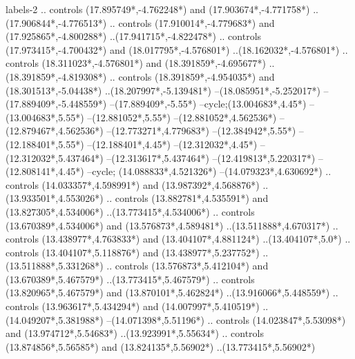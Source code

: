 {\begin{scope}[x=1mm,y=1mm,line width=\SCstroke mm,line cap=round,line join=round]
\begin{SCpart}{labels-2}
.. controls ({17.895749*\SCF},{-4.762248*\SCF}) and ({17.903674*\SCF},{-4.771758*\SCF}) ..({17.906844*\SCF},{-4.776513*\SCF})
.. controls ({17.910014*\SCF},{-4.779683*\SCF}) and ({17.925865*\SCF},{-4.800288*\SCF}) ..({17.941715*\SCF},{-4.822478*\SCF})
.. controls ({17.973415*\SCF},{-4.700432*\SCF}) and ({18.017795*\SCF},{-4.576801*\SCF}) ..({18.162032*\SCF},{-4.576801*\SCF})
.. controls ({18.311023*\SCF},{-4.576801*\SCF}) and ({18.391859*\SCF},{-4.695677*\SCF}) ..({18.391859*\SCF},{-4.819308*\SCF})
.. controls ({18.391859*\SCF},{-4.954035*\SCF}) and ({18.301513*\SCF},{-5.04438*\SCF}) ..({18.207997*\SCF},{-5.139481*\SCF})
--({18.085951*\SCF},{-5.252017*\SCF})
--({17.889409*\SCF},{-5.448559*\SCF})
--({17.889409*\SCF},{-5.55*\SCF})
--cycle; ({13.004683*\SCF},{4.45*\SCF})
--({13.004683*\SCF},{5.55*\SCF})
--({12.881052*\SCF},{5.55*\SCF})
--({12.881052*\SCF},{4.562536*\SCF})
--({12.879467*\SCF},{4.562536*\SCF})
--({12.773271*\SCF},{4.779683*\SCF})
--({12.384942*\SCF},{5.55*\SCF})
--({12.188401*\SCF},{5.55*\SCF})
--({12.188401*\SCF},{4.45*\SCF})
--({12.312032*\SCF},{4.45*\SCF})
--({12.312032*\SCF},{5.437464*\SCF})
--({12.313617*\SCF},{5.437464*\SCF})
--({12.419813*\SCF},{5.220317*\SCF})
--({12.808141*\SCF},{4.45*\SCF})
--cycle;
 ({14.088833*\SCF},{4.521326*\SCF})
--({14.079323*\SCF},{4.630692*\SCF})
.. controls ({14.033357*\SCF},{4.598991*\SCF}) and ({13.987392*\SCF},{4.568876*\SCF}) ..({13.933501*\SCF},{4.553026*\SCF})
.. controls ({13.882781*\SCF},{4.535591*\SCF}) and ({13.827305*\SCF},{4.534006*\SCF}) ..({13.773415*\SCF},{4.534006*\SCF})
.. controls ({13.670389*\SCF},{4.534006*\SCF}) and ({13.576873*\SCF},{4.589481*\SCF}) ..({13.511888*\SCF},{4.670317*\SCF})
.. controls ({13.438977*\SCF},{4.763833*\SCF}) and ({13.404107*\SCF},{4.881124*\SCF}) ..({13.404107*\SCF},{5.0*\SCF})
.. controls ({13.404107*\SCF},{5.118876*\SCF}) and ({13.438977*\SCF},{5.237752*\SCF}) ..({13.511888*\SCF},{5.331268*\SCF})
.. controls ({13.576873*\SCF},{5.412104*\SCF}) and ({13.670389*\SCF},{5.467579*\SCF}) ..({13.773415*\SCF},{5.467579*\SCF})
.. controls ({13.820965*\SCF},{5.467579*\SCF}) and ({13.870101*\SCF},{5.462824*\SCF}) ..({13.916066*\SCF},{5.448559*\SCF})
.. controls ({13.963617*\SCF},{5.434294*\SCF}) and ({14.007997*\SCF},{5.410519*\SCF}) ..({14.049207*\SCF},{5.381988*\SCF})
--({14.071398*\SCF},{5.51196*\SCF})
.. controls ({14.023847*\SCF},{5.53098*\SCF}) and ({13.974712*\SCF},{5.54683*\SCF}) ..({13.923991*\SCF},{5.55634*\SCF})
.. controls ({13.874856*\SCF},{5.56585*\SCF}) and ({13.824135*\SCF},{5.56902*\SCF}) ..({13.773415*\SCF},{5.56902*\SCF})

\end{SCpart}
\end{scope}}
